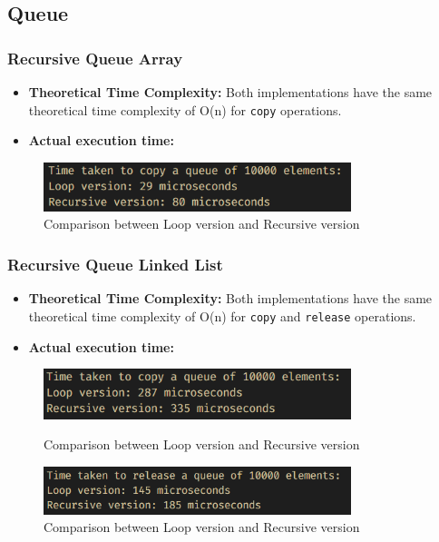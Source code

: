 \thispagestyle{empty}
\subsection{Queue}
\subsubsection*{Recursive Queue Array}
\begin{itemize}
	\item \textbf{Theoretical Time Complexity:} Both implementations have the same theoretical time complexity of O(n) for \verb|copy| operations.
	\item \textbf{Actual execution time:}
\end{itemize}
\begin{figure}[H]
	\centering
	\includegraphics[width=0.8\textwidth]{images/recursive_queue/array/copy_time.png}
	\caption{Comparison between Loop version and Recursive version}\label{fig:rq_arr_copy_time}
\end{figure}

\subsubsection*{Recursive Queue Linked List}
\begin{itemize}
	\item \textbf{Theoretical Time Complexity:} Both implementations have the same theoretical time complexity of O(n) for \verb|copy| and \verb|release| operations.
	\item \textbf{Actual execution time:}
\end{itemize}
\begin{figure}[!ht]
	\centering
        \includegraphics[width=0.8\textwidth]{images/recursive_queue/linked_list/copy_time.png}
        \caption{Comparison between Loop version and Recursive version}\label{fig:rq_ll_copy_time}
	\hfill
        \vfill
        \centering
        \includegraphics[width=0.8\textwidth]{images/recursive_queue/linked_list/release_time.png}
        \caption{Comparison between Loop version and Recursive version}\label{fig:rq_ll_release_time}
\end{figure}
